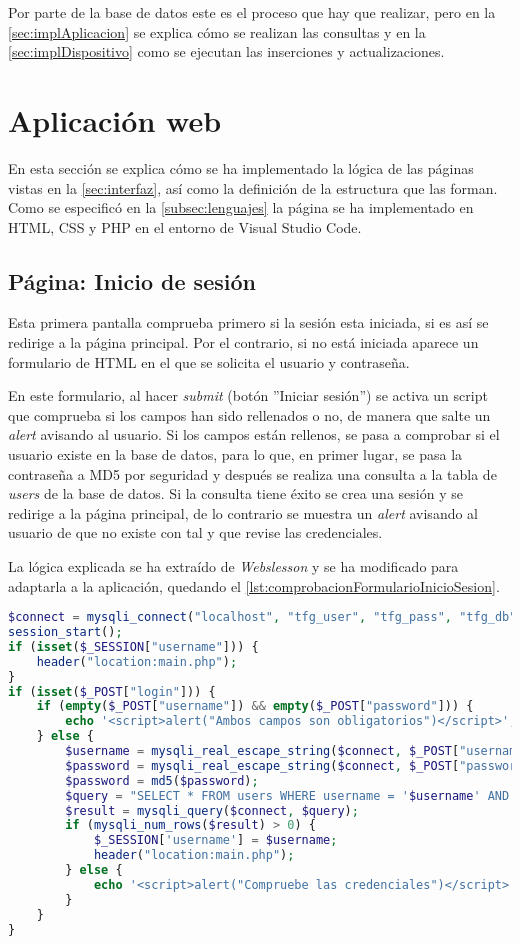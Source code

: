 Por parte de la base de datos este es el proceso que hay que realizar, pero en la \autoref{sec:implAplicacion} se explica cómo se realizan las consultas y en la \autoref{sec:implDispositivo} como se ejecutan las inserciones y actualizaciones.

\section{Aplicación web}\label{sec:implAplicacion}
En esta sección se explica cómo se ha implementado la lógica de las páginas vistas en la \autoref{sec:interfaz}, así como la definición de la estructura que las forman. Como se especificó en la \autoref{subsec:lenguajes} la página se ha implementado en HTML, CSS y PHP en el entorno de Visual Studio Code.

\subsection{Página: Inicio de sesión}
Esta primera pantalla comprueba primero si la sesión esta iniciada, si es así se redirige a la página principal. Por el contrario, si no está iniciada aparece un formulario de HTML en el que se solicita el usuario y contraseña. 

En este formulario, al hacer \textit{submit} (botón ''Iniciar sesión'') se activa un script que comprueba si los campos han sido rellenados o no, de manera que salte un \textit{alert} avisando al usuario. Si los campos están rellenos, se pasa a comprobar si el usuario existe en la base de datos, para lo que, en primer lugar, se pasa la contraseña a MD5 por seguridad y después se realiza una consulta a la tabla de \textit{users} de la base de datos. Si la consulta tiene éxito se crea una sesión y se redirige a la página principal, de lo contrario se muestra un \textit{alert} avisando al usuario de que no existe con tal y que revise las credenciales.

La lógica explicada se ha extraído de \textit{Webslesson} \cite{webslesson_php_nodate} y se ha modificado para adaptarla a la aplicación, quedando el \autoref{lst:comprobacionFormularioInicioSesion}.
\begin{lstlisting}[language=PHP, caption=Comprobación formulario Inicio de sesión, label=lst:comprobacionFormularioInicioSesion]
$connect = mysqli_connect("localhost", "tfg_user", "tfg_pass", "tfg_db");
session_start();
if (isset($_SESSION["username"])) {
    header("location:main.php");
}
if (isset($_POST["login"])) {
    if (empty($_POST["username"]) && empty($_POST["password"])) {
        echo '<script>alert("Ambos campos son obligatorios")</script>';
    } else {
        $username = mysqli_real_escape_string($connect, $_POST["username"]);
        $password = mysqli_real_escape_string($connect, $_POST["password"]);
        $password = md5($password);
        $query = "SELECT * FROM users WHERE username = '$username' AND password = '$password'";
        $result = mysqli_query($connect, $query);
        if (mysqli_num_rows($result) > 0) {
            $_SESSION['username'] = $username;
            header("location:main.php");
        } else {
            echo '<script>alert("Compruebe las credenciales")</script>';
        }
    }
}
\end{lstlisting}

